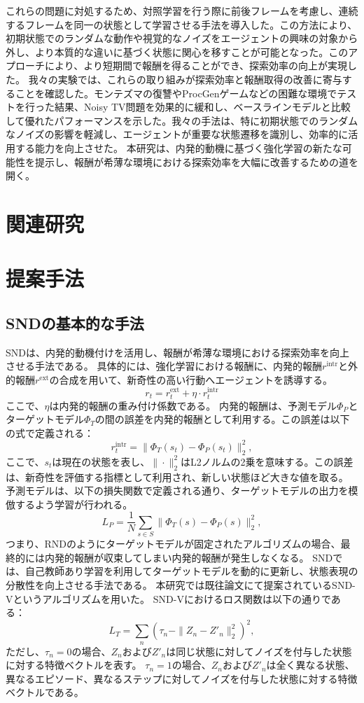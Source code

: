 これらの問題に対処するため、対照学習を行う際に前後フレームを考慮し、連続するフレームを同一の状態として学習させる手法を導入した。この方法により、初期状態でのランダムな動作や視覚的なノイズをエージェントの興味の対象から外し、より本質的な違いに基づく状態に関心を移すことが可能となった。このアプローチにより、より短期間で報酬を得ることができ、探索効率の向上が実現した。
我々の実験では、これらの取り組みが探索効率と報酬取得の改善に寄与することを確認した。モンテズマの復讐やProcGenゲームなどの困難な環境でテストを行った結果、Noisy TV問題を効果的に緩和し、ベースラインモデルと比較して優れたパフォーマンスを示した。我々の手法は、特に初期状態でのランダムなノイズの影響を軽減し、エージェントが重要な状態遷移を識別し、効率的に活用する能力を向上させた。
本研究は、内発的動機に基づく強化学習の新たな可能性を提示し、報酬が希薄な環境における探索効率を大幅に改善するための道を開く。

\section{関連研究}


\section{提案手法}
\subsection{SNDの基本的な手法}
SNDは、内発的動機付けを活用し、報酬が希薄な環境における探索効率を向上させる手法である。
具体的には、強化学習における報酬に、内発的報酬\(r^{\text{intr}}\)と外的報酬\(r^{\text{ext}}\)の合成を用いて、新奇性の高い行動へエージェントを誘導する。
\[
 r_t = r^{\text{ext}}_{t} + \eta \cdot r^{\text{intr}}_{t}
\]
ここで、\(\eta\)は内発的報酬の重み付け係数である。
内発的報酬は、予測モデル\(\Phi_P\)とターゲットモデル\(\Phi_T\)の間の誤差を内発的報酬として利用する。この誤差は以下の式で定義される：
\[
 r^{\text{intr}}_{t} = \| \Phi_T(s_t) - \Phi_P(s_t) \|_2^2,
\]
ここで、\(s_t\)は現在の状態を表し、\(\|\cdot\|_2^2\)はL2ノルムの2乗を意味する。この誤差は、新奇性を評価する指標として利用され、新しい状態ほど大きな値を取る。
予測モデルは、以下の損失関数で定義される通り、ターゲットモデルの出力を模倣するよう学習が行われる。
\[
 L_P = \frac{1}{N} \sum_{s \in S} \| \Phi_T(s) - \Phi_P(s) \|_2^2,
\]
つまり、RNDのようにターゲットモデルが固定されたアルゴリズムの場合、最終的には内発的報酬が収束してしまい内発的報酬が発生しなくなる。
SNDでは、自己教師あり学習を利用してターゲットモデルを動的に更新し、状態表現の分散性を向上させる手法である。
本研究では既往論文にて提案されているSND-Vというアルゴリズムを用いた。
SND-Vにおけるロス関数は以下の通りである：
\[
 L_T = \sum_{n} (\tau_n - \| Z_n - Z'_n \|_2^2)^2,
\]
ただし、\(\tau_n = 0\)の場合、\(Z_n\)および\(Z'_n\)は同じ状態に対してノイズを付与した状態に対する特徴ベクトルを表す。
\(\tau_n = 1\)の場合、\(Z_n\)および\(Z'_n\)は全く異なる状態、異なるエピソード、異なるステップに対してノイズを付与した状態に対する特徴ベクトルである。

